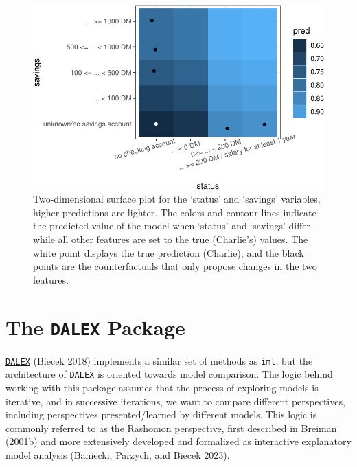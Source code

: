 \begin{figure}[H]

{\centering \includegraphics[width=1\textwidth,height=\textheight]{chapters/chapter12/model_interpretation_files/figure-pdf/fig-cf-mocsurface-1.pdf}

}

\caption{\label{fig-cf-mocsurface}Two-dimensional surface plot for the
`status' and `savings' variables, higher predictions are lighter. The
colors and contour lines indicate the predicted value of the model when
`status' and `savings' differ while all other features are set to the
true (Charlie's) values. The white point displays the true prediction
(Charlie), and the black points are the counterfactuals that only
propose changes in the two features.}

\end{figure}

\hypertarget{sec-dalex}{%
\section{\texorpdfstring{The \texttt{DALEX}
Package}{The DALEX Package}}\label{sec-dalex}}

\href{https://cran.r-project.org/package=DALEX}{\texttt{DALEX}}
(Biecek 2018) implements a similar set of methods as \texttt{iml}, but
the architecture of \texttt{DALEX} is oriented towards model comparison.
The logic behind working with this package assumes that the process of
exploring models is iterative, and in successive iterations, we want to
compare different perspectives, including perspectives presented/learned
by different models. This logic is commonly referred to as the
Rashomon perspective, first described in Breiman (2001b)
and more extensively developed and formalized as interactive explanatory
model analysis (Baniecki, Parzych, and Biecek 2023).

